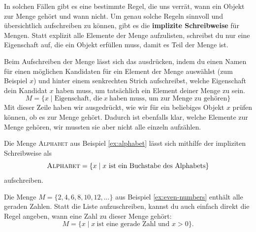 \documentclass[../../main.tex]{subfiles}
\begin{document}
In solchen Fällen gibt es eine bestimmte Regel, die uns verrät, wann ein Objekt zur Menge gehört und wann nicht. Um genau solche Regeln sinnvoll und übersichtlich aufschreiben zu können, gibt es die \textbf{implizite Schreibweise} für Mengen. Statt explizit alle Elemente der Menge aufzulisten, schreibst du nur eine Eigenschaft auf, die ein Objekt erfüllen muss, damit es Teil der Menge ist.

Beim Aufschreiben der Menge lässt sich das ausdrücken, indem du einen Namen für einen möglichen Kandidaten für ein Element der Menge auswählst (zum Beispiel $x$) und hinter einem senkrechten Strich aufschreibst, welche Eigenschaft dein Kandidat $x$ haben muss, um tatsächlich ein Element deiner Menge zu sein.
\[M=\{x\mid \text{Eigenschaft,~die}~x~\text{haben~muss,~um~zur~Menge~zu~gehören}\}\]
Mit dieser Zeile haben wir ausgedrückt, wie wir für ein beliebiges Objekt $x$ prüfen können, ob es zur Menge gehört. Dadurch ist ebenfalls klar, welche Elemente zur Menge gehören, wir mussten sie aber nicht alle einzeln aufzählen.

\begin{example}{}
    Die Menge \textsc{Alphabet} aus Beispiel \ref{ex:alphabet} lässt sich mithilfe der impliziten Schreibweise als
    \[\textsc{Alphabet}=\{x\mid x~\text{ist~ein~Buchstabe~des~Alphabets}\}\]
    aufschreiben.
\end{example}

\begin{example}{}
    Die Menge $M=\{2,4,6,8,10,12,\dots\}$ aus Beispiel \ref{ex:even-numbers} enthält alle geraden Zahlen. Statt die Liste aufzuschreiben, kannst du auch einfach direkt die Regel angeben, wann eine Zahl zu dieser Menge gehört:
    \[M=\{x\mid x~\text{ist~eine~gerade~Zahl~und~}x>0\}.\]
\end{example}
\end{document}
